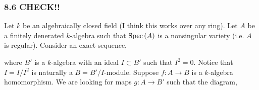 \documentclass[12pt]{article}
\begin{document}
\subsubsection{8.6 CHECK!!}

Let $k$ be an algebraically closed field (I think this works over any ring). Let $A$ be a finitely denerated $k$-algebra such that $\mathrm{Spec}\left( A \right)$ is a nonsingular variety (i.e. $A$ is regular). Consider an exact sequence,
\begin{center}
\end{center}
where $B'$ is a $k$-algebra with an ideal $I \subset B'$ such that $I^2 = 0$. Notice that $I = I/I^2$ is naturally a $B = B'/I$-module. Suppose $f : A \to B$ is a $k$-algebra homomorphism. We are looking for maps $g : A \to B'$ such that the diagram,
\begin{center}
\end{center}
\end{document}
